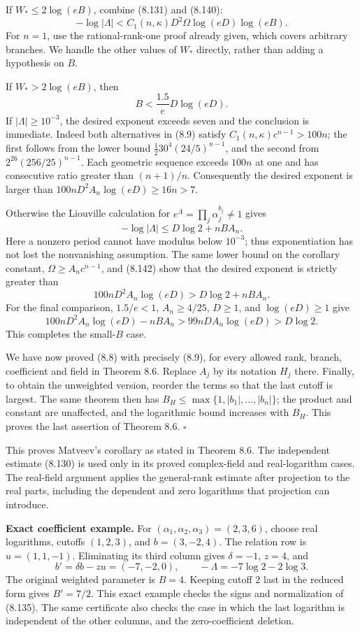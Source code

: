 \documentclass[
  11pt,
  a4paper,
]{article}
\begin{document}
If \(W_*\le2\log(eB)\), combine (8.131) and (8.140): \[
-\log|\Lambda|
<
C_1(n,\kappa)D^2\Omega\log(eD)\log(eB).
\] For \(n=1\), use the rational-rank-one proof already given, which
covers arbitrary branches. We handle the other values of \(W_*\)
directly, rather than adding a hypothesis on \(B\).

If \(W_*>2\log(eB)\), then \[
B<\frac{1.5}{e}D\log(eD).
\tag{8.142}
\] If \(|\Lambda|\ge10^{-3}\), the desired exponent exceeds seven and
the conclusion is immediate. Indeed both alternatives in (8.9) satisfy
\(C_1(n,\kappa)c^{n-1}>100n\); the first follows from the lower bound
\(\tfrac12 30^4(24/5)^{n-1}\), and the second from
\(2^{26}(256/25)^{n-1}\). Each geometric sequence exceeds \(100n\) at
one and has consecutive ratio greater than \((n+1)/n\). Consequently the
desired exponent is larger than \(100nD^2A_n\log(eD)\ge16n>7\).

Otherwise the Liouville calculation for
\(e^\Lambda=\prod_j\alpha_j^{b_j}\ne1\) gives \[
-\log|\Lambda|\le D\log2+nBA_n.
\] Here a nonzero period cannot have modulus below \(10^{-3}\); thus
exponentiation has not lost the nonvanishing assumption. The same lower
bound on the corollary constant, \(\Omega\ge A_nc^{n-1}\), and (8.142)
show that the desired exponent is strictly greater than \[
100nD^2A_n\log(eD)
>D\log2+nBA_n.
\] For the final comparison, \(1.5/e<1\), \(A_n\ge4/25\), \(D\ge1\), and
\(\log(eD)\ge1\) give \[
100nD^2A_n\log(eD)-nBA_n
>99nDA_n\log(eD)>D\log2.
\] This completes the small-\(B\) case.

We have now proved (8.8) with precisely (8.9), for every allowed rank,
branch, coefficient and field in Theorem 8.6. Replace \(A_j\) by its
notation \(H_j\) there. Finally, to obtain the unweighted version,
reorder the terms so that the last cutoff is largest. The same theorem
then has \(B_H\le\max\{1,|b_1|,\ldots,|b_n|\}\); the product and
constant are unaffected, and the logarithmic bound increases with
\(B_H\). This proves the last assertion of Theorem 8.6. \(\square\)

This proves Matveev's corollary as stated in Theorem 8.6. The
independent estimate (8.130) is used only in its proved complex-field
and real-logarithm cases. The real-field argument applies the
general-rank estimate after projection to the real parts, including the
dependent and zero logarithms that projection can introduce.

\textbf{Exact coefficient example.} For \((\alpha_1,\alpha_2,\alpha_3)
=(2,3,6)\), choose real logarithms, cutoffs \((1,2,3)\), and
\(b=(3,-2,4)\). The relation row is \(u=(1,1,-1)\). Eliminating its
third column gives \(\delta=-1\), \(z=4\), and \[
b'=\delta b-zu=(-7,-2,0),\qquad
-\Lambda=-7\log2-2\log3.
\] The original weighted parameter is \(B=4\). Keeping cutoff \(2\) last
in the reduced form gives \(B'=7/2\). This exact example checks the
signs and normalization of (8.135). The same certificate also checks the
case in which the last logarithm is independent of the other columns,
and the zero-coefficient deletion.
\end{document}
